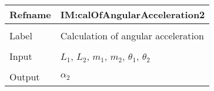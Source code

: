 \documentclass[12pt]{article}
\begin{document}
\vspace{\baselineskip}
\noindent
\begin{minipage}{\textwidth}
\begin{tabular}{>{\raggedright}p{}>{\raggedright\arraybackslash}p{}}
\toprule \textbf{Refname} & \textbf{IM:calOfAngularAcceleration2}
\label{IM:calOfAngularAcceleration2}
\\ \midrule \\
Label & Calculation of angular acceleration
        
\\ \midrule \\
Input & ${L_{1}}$, ${L_{2}}$, ${m_{1}}$, ${m_{2}}$, ${θ_{1}}$, ${θ_{2}}$
        
\\ \midrule \\
Output & ${α_{2}}$
         

\end{tabular}
\end{minipage}
\end{document}
